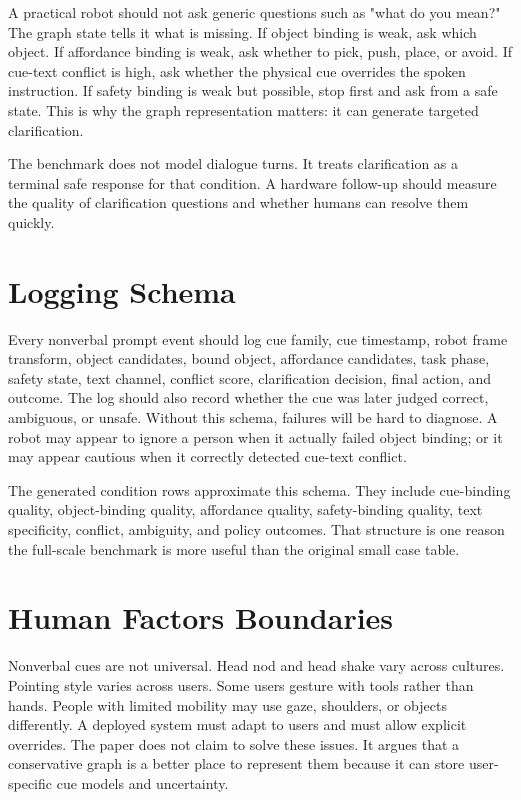 \documentclass{article}
\begin{document}
A practical robot should not ask generic questions such as "what do you mean?" The graph state tells it what is missing. If object binding is weak, ask which object. If affordance binding is weak, ask whether to pick, push, place, or avoid. If cue-text conflict is high, ask whether the physical cue overrides the spoken instruction. If safety binding is weak but possible, stop first and ask from a safe state. This is why the graph representation matters: it can generate targeted clarification.

The benchmark does not model dialogue turns. It treats clarification as a terminal safe response for that condition. A hardware follow-up should measure the quality of clarification questions and whether humans can resolve them quickly.

\section{Logging Schema}

Every nonverbal prompt event should log cue family, cue timestamp, robot frame transform, object candidates, bound object, affordance candidates, task phase, safety state, text channel, conflict score, clarification decision, final action, and outcome. The log should also record whether the cue was later judged correct, ambiguous, or unsafe. Without this schema, failures will be hard to diagnose. A robot may appear to ignore a person when it actually failed object binding; or it may appear cautious when it correctly detected cue-text conflict.

The generated condition rows approximate this schema. They include cue-binding quality, object-binding quality, affordance quality, safety-binding quality, text specificity, conflict, ambiguity, and policy outcomes. That structure is one reason the full-scale benchmark is more useful than the original small case table.

\section{Human Factors Boundaries}

Nonverbal cues are not universal. Head nod and head shake vary across cultures. Pointing style varies across users. Some users gesture with tools rather than hands. People with limited mobility may use gaze, shoulders, or objects differently. A deployed system must adapt to users and must allow explicit overrides. The paper does not claim to solve these issues. It argues that a conservative graph is a better place to represent them because it can store user-specific cue models and uncertainty.
\end{document}
